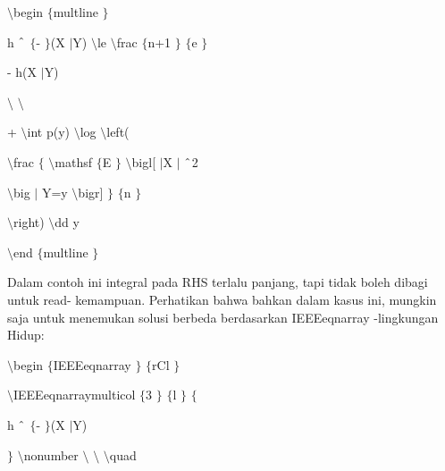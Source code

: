 \begin{itemize}
\vspace{12pt}
\noindent 
 $  \setminus  $begin $  \{  $multline $  \}  $ \par
\vspace{12pt}
\noindent 
h $  \string^  $ $  \{  $- $  \}  $(X $  \vert  $Y)  $  \setminus  $le  $  \setminus  $frac $  \{  $n+1 $  \}  $ $  \{  $e $  \}  $ \par
\vspace{12pt}
\noindent 
- h(X $  \vert  $Y) \par
\vspace{12pt}
\noindent 
 $  \setminus  $ $  \setminus  $ \par
\noindent 
+  $  \setminus  $int p(y)  $  \setminus  $log  $  \setminus  $left( \par
\vspace{12pt}
\noindent 
 $  \setminus  $frac $  \{  $ $  \setminus  $mathsf $  \{  $E $  \}  $ $  \setminus  $bigl[ $  \vert  $X $  \vert  $ $  \string^  $2 \par
\vspace{12pt}
\noindent 
 $  \setminus  $big $  \vert  $ Y=y $  \setminus  $bigr] $  \}  $ $  \{  $n $  \}  $ \par
\vspace{12pt}
\noindent 
 $  \setminus  $right)  $  \setminus  $dd y \par
\noindent 
 $  \setminus  $end $  \{  $multline $  \}  $ \par
\noindent 
Dalam contoh ini integral pada RHS terlalu panjang, tapi tidak boleh dibagi untuk read- kemampuan. Perhatikan bahwa bahkan dalam kasus ini, mungkin saja untuk menemukan solusi berbeda berdasarkan IEEEeqnarray -lingkungan Hidup: \par
\vspace{12pt}
\vspace{12pt}
\noindent 
 $  \setminus  $begin $  \{  $IEEEeqnarray $  \}  $ $  \{  $rCl $  \}  $ \par
\vspace{12pt}
\noindent 
 $  \setminus  $IEEEeqnarraymulticol $  \{  $3 $  \}  $ $  \{  $l $  \}  $ $  \{  $ \par
\vspace{12pt}
\noindent 
h $  \string^  $ $  \{  $- $  \}  $(X $  \vert  $Y) \par
\vspace{12pt}
\noindent 
 $  \}  $ $  \setminus  $nonumber $  \setminus  $ $  \setminus  $ $  \setminus  $quad \par
\vspace{12pt}

\end{itemize}
